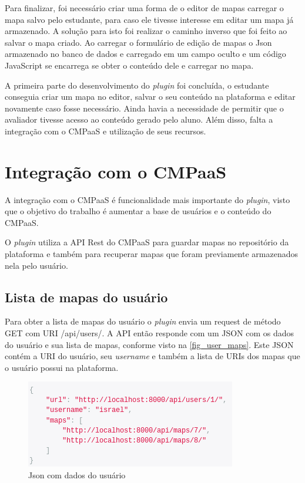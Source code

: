 \documentclass[
	12pt,				%
	openright,			%
	oneside,			%
	a4paper,			%
	english,			%
	french,				%
	spanish,			%
	brazil				%
	]{abntex2}
\begin{document}
Para finalizar, foi necessário criar uma forma de o editor de mapas carregar o mapa salvo pelo estudante, para caso ele tivesse interesse em editar um mapa já armazenado. A solução para isto foi realizar o caminho inverso que foi feito ao salvar o mapa criado. Ao carregar o formulário de edição de mapas o Json armazenado no banco de dados e carregado em um campo oculto e um código JavaScript se encarrega se obter o conteúdo dele e carregar no mapa.

A primeira parte do desenvolvimento do \textit{plugin} foi concluída, o estudante conseguia criar um mapa no editor, salvar o seu conteúdo na plataforma e editar novamente caso fosse necessário. Ainda havia a necessidade de permitir que o avaliador tivesse acesso ao conteúdo gerado pelo aluno. Além disso, falta a integração com o CMPaaS e utilização de seus recursos.

\section{Integração com o CMPaaS}

A integração com o CMPaaS é funcionalidade mais importante do \textit{plugin}, visto que o objetivo do trabalho é aumentar a base de usuários e o conteúdo do CMPaaS.

O \textit{plugin} utiliza a API Rest do CMPaaS para guardar mapas no repositório da plataforma e também para recuperar mapas que foram previamente armazenados nela pelo usuário. 

\subsection{Lista de mapas do usuário}

Para obter a lista de mapas do usuário o \textit{plugin} envia um request de método GET com URI /api/users/. A API então responde com um JSON com os dados do usuário e sua lista de mapas, conforme visto na \autoref{fig_user_maps}. Este JSON contém a URI do usuário, seu \textit{username} e também a lista de URIs dos mapas que o usuário possui na plataforma.

\begin{figure}[htb]
	\caption{\label{fig_user_maps} Json com dados do usuário}
	\begin{center}
		\includegraphics[scale=0.6]{user_maps.png}
	\end{center}
\end{figure}
\end{document}
